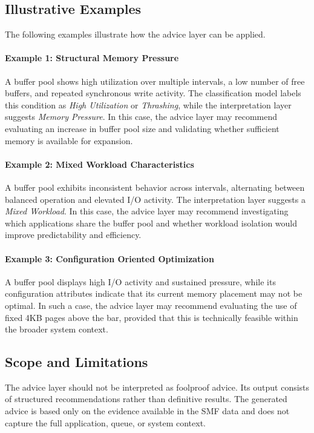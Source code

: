 \subsection{Illustrative Examples}

The following examples illustrate how the advice layer can be applied.

\paragraph{Example 1: Structural Memory Pressure}
A buffer pool shows high utilization over multiple intervals, a low number of free buffers, and repeated synchronous write activity. The classification model labels this condition as \textit{High Utilization} or \textit{Thrashing}, while the interpretation layer suggests \textit{Memory Pressure}. In this case, the advice layer may recommend evaluating an increase in buffer pool size and validating whether sufficient memory is available for expansion.

\paragraph{Example 2: Mixed Workload Characteristics}
A buffer pool exhibits inconsistent behavior across intervals, alternating between balanced operation and elevated I/O activity. The interpretation layer suggests a \textit{Mixed Workload}. In this case, the advice layer may recommend investigating which applications share the buffer pool and whether workload isolation would improve predictability and efficiency.

\paragraph{Example 3: Configuration Oriented Optimization}
A buffer pool displays high I/O activity and sustained pressure, while its configuration attributes indicate that its current memory placement may not be optimal. In such a case, the advice layer may recommend evaluating the use of fixed 4KB pages above the bar, provided that this is technically feasible within the broader system context.

\subsection{Scope and Limitations}

The advice layer should not be interpreted as foolproof advice. Its output consists of structured recommendations rather than definitive results. The generated advice is based only on the evidence available in the SMF data and does not capture the full application, queue, or system context.

